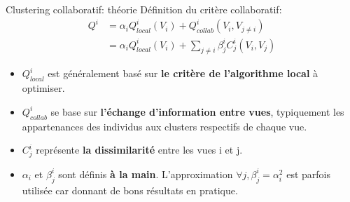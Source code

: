 \documentclass[hyperref={pdfpagelabels=false}]{beamer}
\begin{document}

    \begin{frame}{Clustering collaboratif: théorie}
        Définition du critère collaboratif:
        \begin{align}
            Q^i &= \alpha_i Q^i_{local}(V_i) + Q^i_{collab}(V_i, V_{j\neq i})\\
            &= \alpha_i Q^i_{local}(V_i) + \sum_{j\neq i} \beta^i_j C_j^i(V_i, 
            V_j)
        \end{align}
        \begin{itemize}
            \item $Q^i_{local}$ est généralement basé sur \textbf{le critère de 
                l'algorithme local} à optimiser.
            \item $Q^i_{collab}$ se base sur \textbf{l'échange d'information 
                entre vues}, typiquement les appartenances des individus aux 
                clusters respectifs de chaque vue.
            \item $C_j^i$ représente \textbf{la dissimilarité} entre les vues i 
                et j.
            \item $\alpha_i$ et $\beta_j^i$ sont définis \textbf{à la main}.  
                L'approximation $\forall j, \beta_j^i = \alpha_i^2$ est parfois 
                utilisée car donnant de bons résultats en pratique.
        \end{itemize}
    \end{frame}
\end{document}
